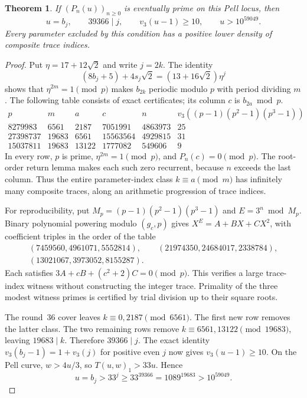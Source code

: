 \documentclass[11pt,a4paper]{article}
\newtheorem{theorem}{Theorem}[section]
\theoremstyle{definition}\newtheorem{definition}[theorem]{Definition}
\theoremstyle{remark}\newtheorem{remark}[theorem]{Remark}
\begin{document}
\begin{theorem}\label{pis:thm:pell-new}
If $(P_n(u))_{n\ge0}$ is eventually prime on this Pell locus, then
\[
 u=b_j,\qquad39366\mid j,\qquad
 v_3(u-1)\ge10,\qquad u>10^{59049}.
\]
Every parameter excluded by this condition has a positive lower
density of composite trace indices.
\end{theorem}
\begin{proof}
Put $\eta=17+12\sqrt2$ and write $j=2k$. The identity
\[
 (8b_j+5)+4s_j\sqrt2=(13+16\sqrt2)\eta^j
\]
shows that $\eta^{2m}=1\pmod p$ makes $b_{2k}$ periodic modulo $p$
with period dividing $m$. The following table consists of exact
certificates; its column $c$ is $b_{2a}\bmod p$.
\[
\begin{array}{r|r|r|r|r|r}
p&m&a&c&n&v_3((p-1)(p^2-1)(p^3-1))\\\hline
8279983&6561&2187&7051991&4863973&25\\
27398737&19683&6561&15563564&4929815&31\\
15037811&19683&13122&1777082&549606&9
\end{array}
\]
In every row, $p$ is prime, $\eta^{2m}=1\pmod p$, and
$P_n(c)=0\pmod p$. The root-order return lemma makes each such
zero recurrent, because $n$ exceeds the last column. Thus the entire
parameter-index class $k\equiv a\pmod m$ has infinitely many
composite traces, along an arithmetic progression of trace indices.

For reproducibility, put $M_p=(p-1)(p^2-1)(p^3-1)$ and
$E=3^n\bmod M_p$. Binary polynomial powering modulo $(g_c,p)$ gives
$X^E=A+BX+CX^2$, with coefficient triples in the order of the table
\[
\begin{gathered}
(7459560,4961071,5552814),\qquad (21974350,24684017,2338784),\\
(13021067,3973052,8155287).\end{gathered}
\]
Each satisfies $3A+cB+(c^2+2)C=0\pmod p$. This verifies a large
trace-index witness without constructing the integer trace.
Primality of the three modest witness primes is certified by trial
division up to their square roots.

The round~36 cover leaves $k\equiv0,2187\pmod{6561}$.
The first new row removes the latter class. The two remaining rows
remove $k\equiv6561,13122\pmod{19683}$, leaving $19683\mid k$.
Therefore $39366\mid j$.
The exact identity $v_3(b_j-1)=1+v_3(j)$ for positive even $j$
now gives $v_3(u-1)\ge10$. On the Pell curve, $w>4u/3$, so
$T(u,w)_1>33u$. Hence
\[
 u=b_j>33^j\ge33^{39366}=1089^{19683}>10^{59049}.
\]
\end{proof}
\end{document}
